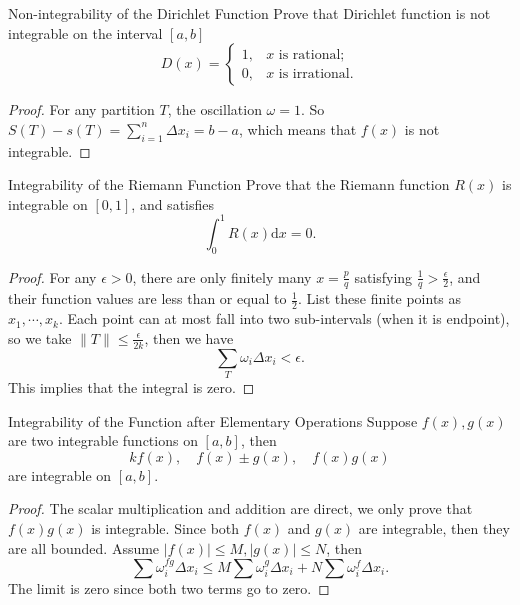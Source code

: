 \begin{example}{Non-integrability of the Dirichlet Function}{}
  Prove that Dirichlet function is not integrable on the interval $[a, b]$
  \begin{equation}
    D(x) =
    \begin{cases}
      1, & x \text{ is rational};\\
      0, & x \text{ is irrational}.
    \end{cases}
  \end{equation}
\end{example}

\begin{proof}
  For any partition $T$,
  the oscillation $\omega = 1$.
  So $S(T) - s(T) = \sum\limits_{i = 1}^n \Delta x_i = b - a$,
  which means that $f(x)$ is not integrable.
\end{proof}

\begin{example}{Integrability of the Riemann Function}{}
  Prove that the Riemann function $R(x)$ is integrable on $[0, 1]$,
  and satisfies
  \begin{equation}
    \int_0^1 R(x) \mathrm{d} x = 0.
  \end{equation}
\end{example}

\begin{proof}
  For any $\epsilon > 0$, there are only finitely many $x = \frac{p}{q}$ satisfying
  $\frac{1}{q} > \frac{\epsilon}{2}$,
  and their function values are less than or equal to $\frac{1}{2}$.
  List these finite points as $x_1,\cdots,x_k$.
  Each point can at most fall into two sub-intervals (when it is endpoint),
  so we take $\|T\| \leq \frac{\epsilon}{2k}$,
  then we have
  \begin{equation}
    \sum _T \omega_i \Delta x_i < \epsilon.
  \end{equation}
  This implies that the integral is zero.
\end{proof}

\begin{proposition}{Integrability of the Function after Elementary Operations}{}
  Suppose $f(x), g(x)$ are two integrable functions on $[a, b]$,
  then 
  \begin{equation}
    kf(x), \quad f(x) \pm g(x), \quad f(x)g(x)
  \end{equation}
  are integrable on $[a, b]$.
\end{proposition}

\begin{proof}
  The scalar multiplication and addition are direct,
  we only prove that $f(x)g(x)$ is integrable.
  Since both $f(x)$ and $g(x)$ are integrable, then they are all bounded.
  Assume $|f(x)| \leq M, |g(x)| \leq N$, then
  \begin{equation}
    \sum \omega_i^{fg} \Delta x_i \leq
    M \sum \omega_i^g \Delta x_i + N \sum \omega_i^f \Delta x_i.
  \end{equation}
  The limit is zero since both two terms go to zero.
\end{proof}

